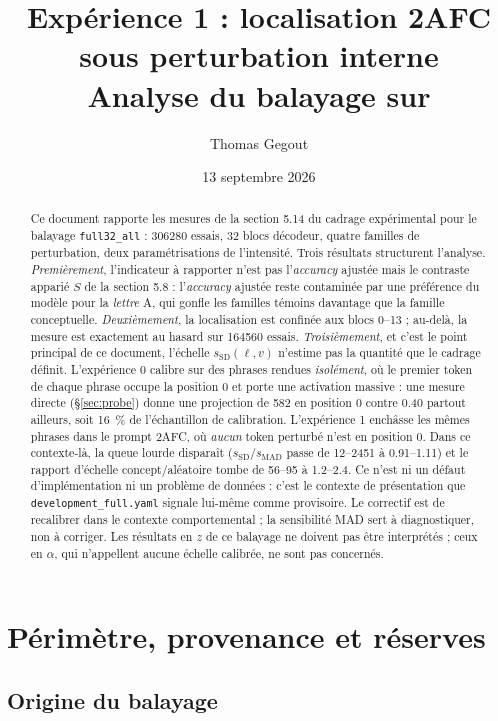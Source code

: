 \documentclass[11pt,a4paper]{article}
\title{Expérience 1 : localisation 2AFC sous perturbation interne\\
       \large Analyse du balayage \code{full32\_all} sur \code{Llama-3.1-8B-Instruct}}
\author{Thomas Gegout}
\date{13 septembre 2026}
\newcommand{\ssd}{s_{\mathrm{SD}}}
\newcommand{\smad}{s_{\mathrm{MAD}}}
\newcommand{\code}[1]{\texttt{\small #1}}
\begin{document}
\maketitle

\begin{abstract}
\noindent
Ce document rapporte les mesures de la section 5.14 du cadrage expérimental pour le
balayage \code{full32\_all} : \num{306280} essais, \num{32} blocs décodeur, quatre
familles de perturbation, deux paramétrisations de l'intensité. Trois résultats
structurent l'analyse. \emph{Premièrement}, l'indicateur à rapporter n'est pas
l'\emph{accuracy} ajustée mais le contraste apparié $S$ de la section 5.8 :
l'\emph{accuracy} ajustée reste contaminée par une préférence du modèle pour la
\emph{lettre} A, qui gonfle les familles témoins davantage que la famille
conceptuelle. \emph{Deuxièmement}, la localisation est confinée aux blocs 0--13 ;
au-delà, la mesure est exactement au hasard sur \num{164560} essais. \emph{Troisièmement},
et c'est le point principal de ce document, l'échelle $\ssd(\ell,v)$ n'estime pas la
quantité que le cadrage définit. L'expérience 0 calibre sur des phrases rendues
\emph{isolément}, où le premier token de chaque phrase occupe la position 0 et porte une
activation massive : une mesure directe (\S\ref{sec:probe}) donne une projection de
\num{582} en position 0 contre \num{0.40} partout ailleurs, soit \SI{16}{\percent} de
l'échantillon de calibration. L'expérience 1 enchâsse les mêmes phrases dans le prompt
2AFC, où \emph{aucun} token perturbé n'est en position 0. Dans ce contexte-là, la queue
lourde disparaît ($\ssd/\smad$ passe de \num{12}--\num{2451} à \num{0.91}--\num{1.11}) et
le rapport d'échelle concept/aléatoire tombe de \num{56}--\num{95} à \num{1.2}--\num{2.4}.
Ce n'est ni un défaut d'implémentation ni un problème de données : c'est le contexte de
présentation que \code{development\_full.yaml} signale lui-même comme provisoire. Le
correctif est de recalibrer dans le contexte comportemental ; la sensibilité MAD sert à
diagnostiquer, non à corriger. Les résultats en $z$ de ce balayage ne doivent pas être
interprétés ; ceux en $\alpha$, qui n'appellent aucune échelle calibrée, ne sont pas
concernés.
\end{abstract}

\section{Périmètre, provenance et réserves}

\subsection{Origine du balayage}
\end{document}
